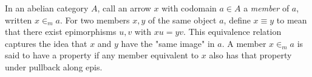 In an abelian category $A$, call an arrow $x$ with codomain $a \in A$ a \emph{member} of $a$, written $x \in_m a$. For two members $x, y$ of the same object $a$, define $x \equiv y$ to mean that there exist epimorphisms $u, v$ with $x u = y v$. This equivalence relation captures the idea that $x$ and $y$ have the "same image" in $a$. A member $x \in_m a$ is said to have a property if any member equivalent to $x$ also has that property under pullback along epis.
